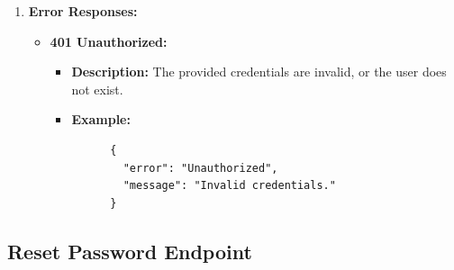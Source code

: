\documentclass[a4 paper, 12pt]{article}
\begin{document}
\begin{enumerate}
  \item \textbf{Error Responses:}
  \begin{itemize}
    \item \textbf{401 Unauthorized:}
    \begin{itemize}
      \item \textbf{Description:} The provided credentials are invalid, or the user does not exist.
      \item \textbf{Example:}
      \begin{verbatim}
      {
        "error": "Unauthorized",
        "message": "Invalid credentials."
      }
      \end{verbatim}
    \end{itemize}
  \end{itemize}
\end{enumerate}
\subsection{Reset Password Endpoint}
\end{document}
